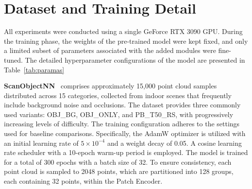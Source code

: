 \clearpage
\setcounter{page}{1}
\maketitlesupplementary
\appendix

\section{Dataset and Training Detail}


All experiments were conducted using a single GeForce RTX 3090 GPU. During the training phase, the weights of the pre-trained model were kept fixed, and only a limited subset of parameters associated with the added modules were fine-tuned. The detailed hyperparameter configurations of the model are presented in Table~\ref{tab:paramas}



\textbf{ScanObjectNN}~\cite{uy2019revisiting} comprises approximately 15,000 point cloud samples distributed across 15 categories, collected from indoor scenes that frequently include background noise and occlusions. The dataset provides three commonly used variants: OBJ\_BG, OBJ\_ONLY, and PB\_T50\_RS, with progressively increasing levels of difficulty. The training configuration adheres to the settings used for baseline comparisons. Specifically, the AdamW optimizer is utilized with an initial learning rate of $5 \times 10^{-4}$ and a weight decay of 0.05. A cosine learning rate scheduler with a 10-epoch warm-up period is employed. The model is trained for a total of 300 epochs with a batch size of 32. To ensure consistency, each point cloud is sampled to 2048 points, which are partitioned into 128 groups, each containing 32 points, within the Patch Encoder.



